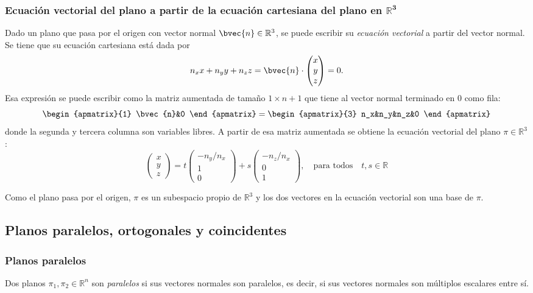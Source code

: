 \documentclass{fmbnotes}
\begin{document}
\subsubsection[Ecuación vectorial del plano a partir de la ecuación cartesiana del plano en \(\mathbb{R}^{3}\)]{Ecuación vectorial del plano a partir de la ecuación cartesiana del plano en \(\bm{\mathbb{R}^{3}}\)}

Dado un plano que pasa por el origen con vector normal \(\bvec{n} \in \mathbb{R}^{3}\), se puede escribir su \emph{ecuación vectorial} a partir del vector normal. Se tiene que su ecuación cartesiana está dada por 
\[n_{x} x+n_{y} y+n_{z} z=\bvec{n} \cdot \begin{pmatrix}
x\\y\\z
\end{pmatrix}=0.\]
Esa expresión se puede escribir como la matriz aumentada de tamaño \(1 \times n+1\) que tiene al vector normal terminado en 0 como fila: 
\[\begin{apmatrix}{1}
\bvec{n}&0
\end{apmatrix}=\begin{apmatrix}{3}
n_x&n_y&n_z&0
\end{apmatrix}\]
donde la segunda y tercera columna son variables libres. A partir de esa matriz aumentada se obtiene la ecuación vectorial del plano \(\pi\in\mathbb{R}^{3}\): 
\[\begin{pmatrix}
x \\y \\ z
\end{pmatrix} = t\begin{pmatrix}
-n_y/n_x\\1\\0
\end{pmatrix}+s\begin{pmatrix}
-n_z/n_x\\0\\1
\end{pmatrix}, \quad \text{para todos} \quad t,s \in \mathbb{R}\]

Como el plano pasa por el origen, \(\pi\) es un subespacio propio de \(\mathbb{R}^{3}\) y los dos vectores en la ecuación vectorial son una base de \(\pi\).

\subsection{ Planos paralelos, ortogonales y coincidentes}

\subsubsection{Planos paralelos}
Dos planos \( \pi_{1}, \pi_{2} \in \mathbb{R}^{n} \) son \emph{paralelos} si sus vectores normales son paralelos, es decir, si sus vectores normales son múltiplos escalares entre sí.
\end{document}
